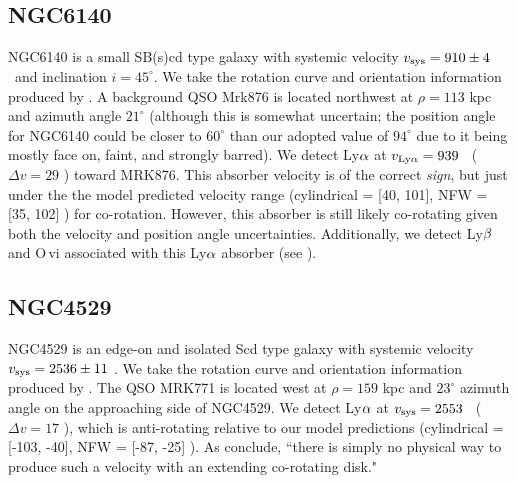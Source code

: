 \subsection{NGC6140} \label{NGC6140}
NGC6140 is a small SB(s)cd type galaxy with systemic velocity $v_{\rm sys} = 910 \pm 4$ \kms~and inclination $i = 45^{\circ}$. We take the rotation curve and orientation information produced by \cite{cote2005}. A background QSO Mrk876 is located northwest at $\rho = 113$ kpc and azimuth angle $21^{\circ}$ (although this is somewhat uncertain; the position angle for NGC6140 could be closer to $60^{\circ}$ than our adopted value of $94^{\circ}$ due to it being mostly face on, faint, and strongly barred). We detect Ly$\rm \alpha$ at $v_{\rm Ly\alpha} =  939$ \kms~($\Delta v = 29$ \kms) toward MRK876. This absorber velocity is of the correct \emph{sign}, but just under the the model predicted velocity range (cylindrical = [40, 101], NFW = [35, 102] \kms) for co-rotation. However, this absorber is still likely co-rotating given both the velocity and position angle uncertainties. Additionally, we detect Ly$\rm \beta$ and O\,{\sc vi} associated with this Ly$\rm \alpha$ absorber (see \cite{narayanan2010}).







\subsection{NGC4529} \label{NGC4529}
NGC4529 is an edge-on and isolated Scd type galaxy with systemic velocity $v_{\rm sys} = 2536 \pm 11$ \kms. We take the rotation curve and orientation information produced by \cite{cote2005}. The QSO MRK771 is located west at $\rho = 159$ kpc and $23^{\circ}$ azimuth angle on the approaching side of NGC4529. We detect Ly$\rm \alpha$ at $v_{\rm sys} = 2553$ \kms~($\Delta v = 17$ \kms), which is anti-rotating relative to our model predictions (cylindrical = [-103, -40], NFW = [-87, -25] \kms). As \cite{cote2005} conclude, ``there is simply no physical way to produce such a velocity with an extending co-rotating disk." \\


